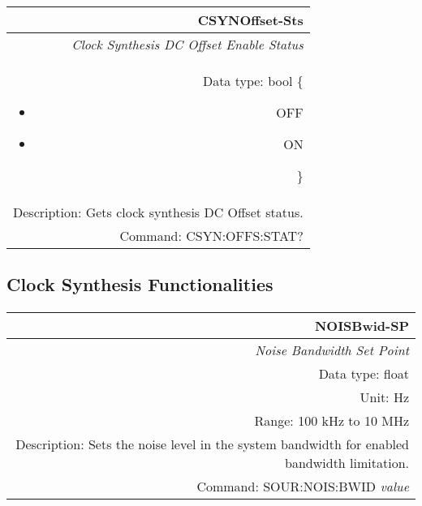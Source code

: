 \documentclass[openany]{article}
\begin{document}
		\begin{tabular}{N}
			\hline
			\bfseries CSYNOffset-Sts \\ \hline
			\emph{Clock Synthesis DC Offset Enable Status} \\
			Data type: bool \{\begin{itemize}[noitemsep]
				\small
				\item[] OFF
				\item[] ON
			\end{itemize}\} \\
			Description: Gets clock synthesis DC Offset status. \\
			Command: CSYN:OFFS:STAT? \\
			
		\end{tabular}
%
	\subsection{Clock Synthesis Functionalities}\label{pvgroup:function} %

		\paragraph{} %

		\begin{tabular}{N}
			\hline
			\bfseries NOISBwid-SP \\ \hline
			\emph{Noise Bandwidth Set Point} \\
			Data type: float \\
			Unit: Hz \\
			Range: 100 kHz to 10 MHz \\
			Description: Sets the noise level in the system bandwidth for enabled bandwidth limitation. \\
			Command: SOUR:NOIS:BWID \emph{value} \\

		\end{tabular}
\end{document}
